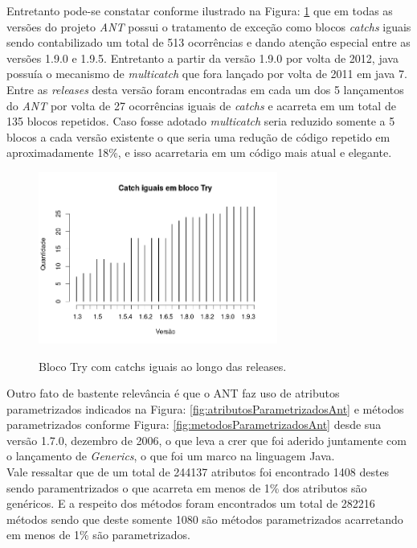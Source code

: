 Entretanto pode-se constatar conforme ilustrado na Figura: \ref{fig:catchIguais} que em todas as versões do projeto \textit{ANT} possui o tratamento de exceção como blocos \textit{catchs} iguais sendo contabilizado um total de 513 ocorrências e dando atenção especial entre as versões 1.9.0 e 1.9.5. Entretanto a partir da versão 1.9.0 por volta de 2012, java possuía o mecanismo de \textit{multicatch} que fora lançado por volta de 2011 em java 7. Entre as \textit{releases} desta versão foram encontradas em cada um dos 5 lançamentos do \textit{ANT} por volta de 27 ocorrências iguais de \textit{catchs} e acarreta em um total de 135 blocos repetidos. Caso fosse adotado \textit{multicatch} seria reduzido somente a 5 blocos a cada versão existente o que seria uma redução de código repetido em aproximadamente 18\%, e isso acarretaria em um código mais atual e elegante.\\

	\begin{figure}[h]
		\center
		\includegraphics[width=0.7\textwidth]{Imagens/catchsIguais}
		\label{fig:catchIguais}
		\caption{Bloco Try com catchs iguais ao longo das releases.}
	\end{figure}


Outro fato de bastente relevância é que o ANT faz uso de atributos parametrizados indicados na Figura: \ref{fig:atributosParametrizadosAnt}  e métodos parametrizados conforme Figura: \ref{fig:metodosParametrizadosAnt} desde sua versão 1.7.0, dezembro de 2006, o que leva a crer que foi aderido juntamente com o lançamento de \textit{Generics}, o que foi um marco na linguagem Java.\\

Vale ressaltar que de um total de 244137 atributos foi encontrado 1408 destes sendo paramentrizados o que acarreta em menos de 1\% dos atributos são genéricos. E a respeito dos métodos foram encontrados um total de 282216 métodos sendo que deste somente 1080 são métodos parametrizados acarretando em menos de 1\% são parametrizados.\\

